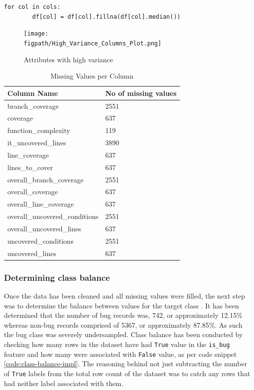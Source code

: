 \begin{code}
\label{code:missing-values-median-code}
\begin{verbatim}
for col in cols:
        df[col] = df[col].fillna(df[col].median())
\end{verbatim}
\end{code}

\begin{figure}[h!]
    \centering
    \texttt{[image: \\figpath/High\_Variance\_Columns\_Plot.png]}
    \caption{Attributes with high variance}
    \label{fig:high-variance}
\end{figure}

\begin{table}[h!]
\centering
\caption{Missing Values per Column}
\label{tbl:missing-values-per-col}
\begin{tabular}{@{}ll@{}}
\toprule
Column Name & No of missing values \\ \midrule
branch\_coverage & 2551 \\
coverage & 637 \\
function\_complexity & 119 \\
it\_uncovered\_lines & 3890 \\
line\_coverage & 637 \\
lines\_to\_cover & 637 \\
overall\_branch\_coverage & 2551 \\
overall\_coverage & 637 \\
overall\_line\_coverage & 637 \\
overall\_uncovered\_conditions & 2551 \\
overall\_uncovered\_lines & 637 \\
uncovered\_conditions & 2551 \\
uncovered\_lines & 637 \\ \bottomrule
\end{tabular}
\end{table}
\FloatBarrier

\subsubsection{Determining class balance}\label{sec:impl-data-analysis:class-balance}
Once the data has been cleaned and all missing values were filled, the next step was to determine the balance between values for the target class \isBug{}. It has been determined that the number of bug records was, 742, or approximately 12.15\% whereas non-bug records comprised of 5367, or approximately 87.85\%. As such the bug class was severely undersampled. Class balance has been conducted by checking how many rows in the dataset have had \texttt{True} value in the \texttt{is\_bug} feature and how many were associated with \texttt{False} value, as per code snippet \ref{code:class-balance-impl}. The reasoning behind not just subtracting the number of \texttt{True} labels from the total row count of the dataset was to catch any rows that had neither label associated with them.

